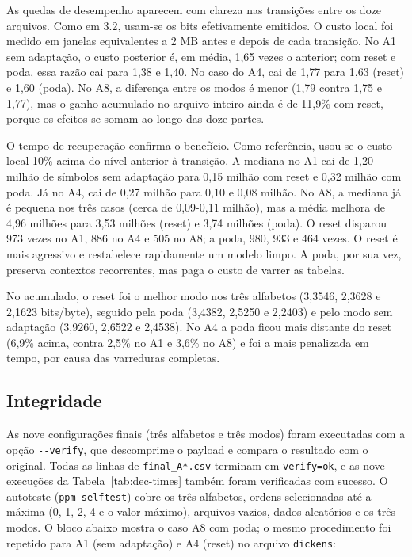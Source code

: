 \documentclass[12pt,a4paper]{article}
\begin{document}
As quedas de desempenho aparecem com clareza nas transi\c{c}\~oes entre os doze
arquivos. Como em 3.2, usam-se os bits efetivamente emitidos. O custo local foi
medido em janelas equivalentes a 2 MB antes e depois de cada transi\c{c}\~ao. No A1
sem adapta\c{c}\~ao, o custo posterior \'e, em m\'edia, 1,65 vezes o anterior; com
reset e poda, essa raz\~ao cai para 1,38 e 1,40. No caso do A4, cai de 1,77 para 1,63
(reset) e 1,60 (poda). No A8, a diferen\c{c}a entre os modos \'e menor (1,79 contra
1,75 e 1,77), mas o ganho acumulado no arquivo inteiro ainda \'e de 11,9\% com
reset, porque os efeitos se somam ao longo das doze partes.

O tempo de recupera\c{c}\~ao confirma o benef\'icio. Como refer\^encia, usou-se o
custo local 10\% acima do n\'ivel anterior \`a transi\c{c}\~ao. A mediana no A1
cai de 1,20 milh\~ao de s\'imbolos sem adapta\c{c}\~ao para 0,15 milh\~ao com reset
e 0,32 milh\~ao com poda. J\'a no A4, cai de 0,27 milh\~ao para 0,10 e 0,08 milh\~ao. No
A8, a mediana j\'a \'e pequena nos tr\^es casos (cerca de 0,09-0,11 milh\~ao), mas
a m\'edia melhora de 4,96 milh\~oes para 3,53 milh\~oes (reset) e 3,74 milh\~oes
(poda). O reset disparou 973 vezes no A1, 886 no A4 e 505 no A8; a poda, 980, 933
e 464 vezes. O reset \'e mais agressivo e restabelece rapidamente um modelo limpo.
A poda, por sua vez, preserva contextos recorrentes, mas paga o custo de varrer as tabelas.

No acumulado, o reset foi o melhor modo nos tr\^es alfabetos (3,3546, 2,3628 e
2,1623 bits/byte), seguido pela poda (3,4382, 2,5250 e 2,2403) e pelo modo sem
adapta\c{c}\~ao (3,9260, 2,6522 e 2,4538). No A4 a poda ficou mais distante do
reset (6,9\% acima, contra 2,5\% no A1 e 3,6\% no A8) e foi a mais penalizada em
tempo, por causa das varreduras completas.

\subsection{Integridade}
As nove configura\c{c}\~oes finais (tr\^es alfabetos e tr\^es modos) foram executadas
com a op\c{c}\~ao \texttt{-{}-verify}, que descomprime o payload e compara o resultado
com o original. Todas as linhas de \texttt{final\_A*.csv} terminam em
\texttt{verify=ok}, e as nove execu\c{c}\~oes da Tabela~\ref{tab:dec-times} tamb\'em
foram verificadas com sucesso. O autoteste (\texttt{ppm selftest}) cobre os tr\^es
alfabetos, ordens selecionadas at\'e a m\'axima (0, 1, 2, 4 e o valor m\'aximo),
arquivos vazios, dados aleat\'orios e os tr\^es modos. O bloco abaixo mostra o caso
A8 com poda; o mesmo procedimento foi repetido para A1 (sem adapta\c{c}\~ao) e A4
(reset) no arquivo \texttt{dickens}:
\end{document}
